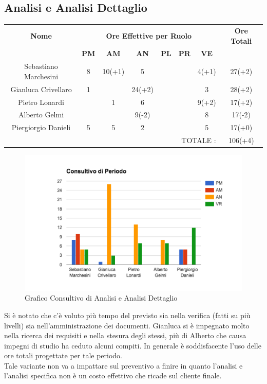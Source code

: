 \documentclass[12pt,a4paper,titlepage]{article}
\begin{document}
		\subsection{Analisi e Analisi Dettaglio}{
	
		{\renewcommand\arraystretch{1.2}  %
			\begin{tabular}{|c|c|c|c|c|c|c|c|}
				\hline 
				\textbf{Nome} & \multicolumn{6}{c|}{\textbf{Ore Effettive per Ruolo}} & \textbf{Ore Totali} \\ 
				& \textbf{PM} & \textbf{AM} & \textbf{AN} & \textbf{PL} & \textbf{PR} & \textbf{VE} & \\ 
				\hline
				Sebastiano Marchesini & 8 & 10(+1) & 5 &  &  & 4(+1) & 27(+2) \\ 
				\hline 
				Gianluca Crivellaro & 1 &  & 24(+2) &  &  & 3 & 28(+2) \\ 
				\hline 
				Pietro Lonardi &  & 1 & 6 &  &  & 9(+2) & 17(+2) \\ 
				\hline 
				Alberto Gelmi &  &  & 9(-2) &  &  & 8 & 17(-2) \\ 
				\hline 
				Piergiorgio Danieli & 5 & 5 & 2 &  &  & 5 & 17(+0) \\ 
				\hline 
				\multicolumn{7}{r|}{TOTALE  :} & 106(+4) \\ 
		\end{tabular}} 
		
		\begin{figure}[p]
			\centering
			\includegraphics[width=0.7\linewidth]{"ConsultivoAnalisi"}
			\caption{Grafico Consultivo di Analisi e Analisi Dettaglio}
			\label{fig:consultivo-analisi}
		\end{figure} 
	
	Si è notato che c'è voluto più tempo del previsto sia nella verifica (fatti su più livelli) sia nell'amministrazione dei documenti. Gianluca si è impegnato molto nella ricerca dei requisiti e nella stesura degli stessi, più di Alberto che causa impegni di studio ha ceduto alcuni compiti. In generale è soddisfacente l'uso delle ore totali progettate per tale periodo.	\\
	Tale variante non va a impattare sul preventivo a finire in quanto l'analisi e l'analisi specifica non è un costo effettivo che ricade sul cliente finale.
	}
		
\end{document}
